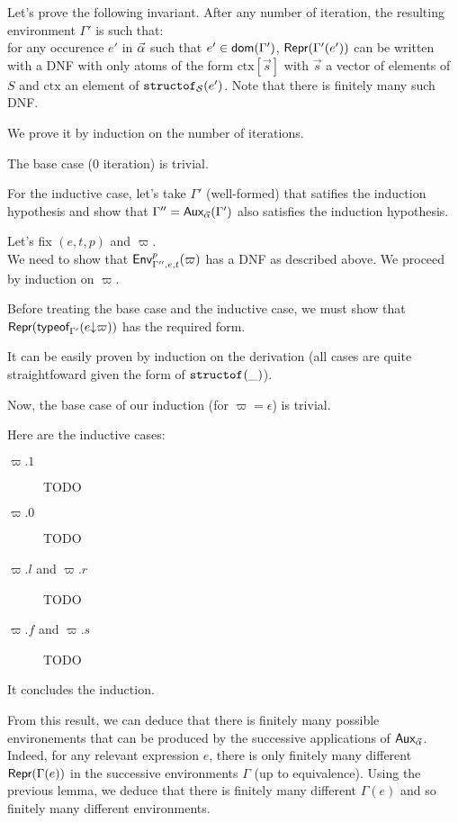 \documentclass[a4paper]{article}
\theoremstyle{definition}
\begin{document}
    Let's prove the following invariant. After any number of iteration, the resulting environment $\Gamma'$ is such that:\\
    for any occurence $e'$ in $\vec \alpha$ such that $e' \in \textsf{dom}(\Gamma')$, $\textsf{Repr}(\Gamma'(e'))$ can be written with a DNF with only atoms
    of the form $\text{ctx}[\vec s]$ with $\vec s$ a vector of elements of $S$ and $\text{ctx}$ an element of $\texttt{structof}_{\mathcal{S}}(e')$.
    Note that there is finitely many such DNF.
        
    We prove it by induction on the number of iterations.

    The base case (0 iteration) is trivial.

    For the inductive case, let's take $\Gamma'$ (well-formed) that satifies the induction hypothesis
    and show that $\Gamma'' = \textsf{Aux}_{\vec \alpha}(\Gamma')$ also satisfies the induction hypothesis.

    Let's fix $(e,t,p)$ and $\varpi$.\\
    We need to show that $\textsf{Env}^{p}_{\Gamma'',e,t} (\varpi)$ has a DNF as described above.    
    We proceed by induction on $\varpi$.

    Before treating the base case and the inductive case, we must show that $\textsf{Repr}(\textsf{typeof}_{\Gamma'}(e{\downarrow}\varpi))$
    has the required form.

    It can be easily proven by induction on the derivation (all cases are quite straightfoward given the form of $\texttt{structof}_{}(\_)$).

    Now, the base case of our induction (for $\varpi=\epsilon$) is trivial.

    Here are the inductive cases:
    \begin{description}
      \item[$\varpi.1$] TODO
      \item[$\varpi.0$] TODO
      \item[$\varpi.l$ and $\varpi.r$] TODO
      \item[$\varpi.f$ and $\varpi.s$] TODO
    \end{description}

    It concludes the induction.

    From this result, we can deduce that there is finitely many possible environements that can be produced by the successive applications of $\textsf{Aux}_{\vec \alpha}$.
    Indeed, for any relevant expression $e$, there is only finitely many different $\textsf{Repr}(\Gamma(e))$ in the successive environments $\Gamma$ (up to equivalence).
    Using the previous lemma, we deduce that there is finitely many different $\Gamma(e)$ and so finitely many different environments.
\end{document}
